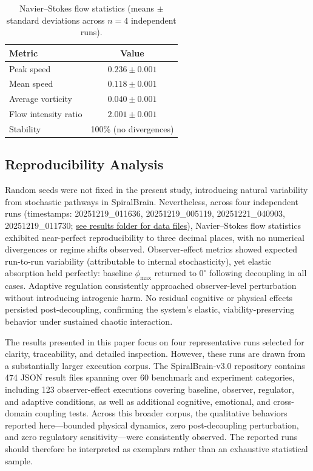\documentclass[12pt,a4paper]{article}
\begin{document}
\begin{table}[htbp!]
\centering
\begin{tabular}{@{}lc@{}}
\toprule
Metric & Value \\
\midrule
Peak speed            & $0.236 \pm 0.001$ \\
Mean speed            & $0.118 \pm 0.001$ \\
Average vorticity     & $0.040 \pm 0.001$ \\
Flow intensity ratio  & $2.001 \pm 0.001$ \\
Stability             & 100\% (no divergences) \\
\bottomrule
\end{tabular}
\captionsetup{justification=raggedright, singlelinecheck=false}
\caption{\small Navier–Stokes flow statistics (means $\pm$ standard deviations across $n=4$ independent runs).}
\label{tab:flow_stats}
\end{table}

\subsection{Reproducibility Analysis}

Random seeds were not fixed in the present study, introducing natural variability from stochastic pathways in SpiralBrain. Nevertheless, across four independent runs (timestamps: 20251219\_011636, 20251219\_005119, 20251221\_040903, 20251219\_011730; \href{results/}{see results folder for data files}), Navier--Stokes flow statistics exhibited near-perfect reproducibility to three decimal places, with no numerical divergences or regime shifts observed. Observer-effect metrics showed expected run-to-run variability (attributable to internal stochasticity), yet elastic absorption held perfectly: baseline $\phi_{\max}$ returned to $0^\circ$ following decoupling in all cases. Adaptive regulation consistently approached observer-level perturbation without introducing iatrogenic harm. No residual cognitive or physical effects persisted post-decoupling, confirming the system's elastic, viability-preserving behavior under sustained chaotic interaction.

The results presented in this paper focus on four representative runs selected for clarity, traceability, and detailed inspection. However, these runs are drawn from a substantially larger execution corpus. The SpiralBrain-v3.0 repository contains 474 JSON result files spanning over 60 benchmark and experiment categories, including 123 observer-effect executions covering baseline, observer, regulator, and adaptive conditions, as well as additional cognitive, emotional, and cross-domain coupling tests. Across this broader corpus, the qualitative behaviors reported here—bounded physical dynamics, zero post-decoupling perturbation, and zero regulatory sensitivity—were consistently observed. The reported runs should therefore be interpreted as exemplars rather than an exhaustive statistical sample.
\end{document}
